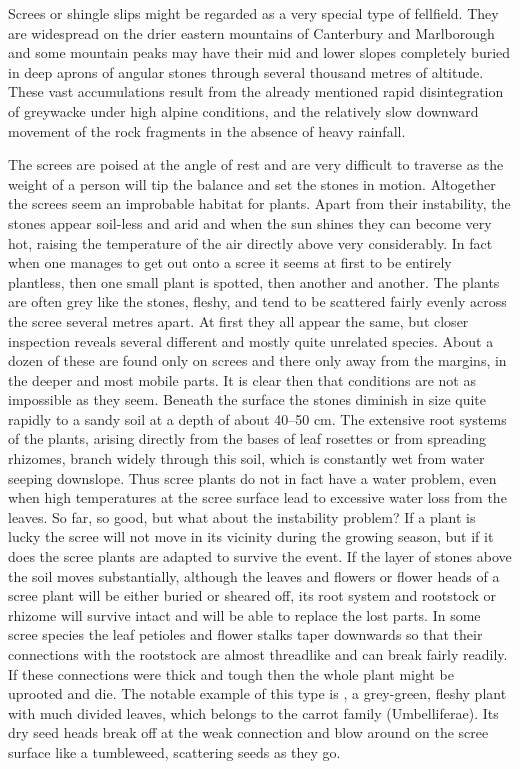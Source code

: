 Screes or shingle slips might be regarded as a very special type of fellfield.
They are widespread on the drier eastern mountains of Canterbury and Marlborough and some mountain peaks may have their mid and lower slopes completely buried in deep aprons of angular stones through several thousand metres of altitude.
These vast accumulations result from the already mentioned rapid disintegration of greywacke under high alpine conditions, and the relatively slow downward movement of the rock fragments in the absence of heavy rainfall.

The screes are poised at the angle of rest and are very difficult to traverse as the weight of a person will tip the balance and set the stones in motion.
Altogether the screes seem an improbable habitat for plants.
Apart from their instability, the stones appear soil-less and arid and when the sun shines they can become very hot, raising the temperature of the air directly above very considerably.
In fact when one manages to get out onto a scree it seems at first to be entirely plantless, then one small plant is spotted, then another and another.
The plants are often grey like the stones, fleshy, and tend to be scattered fairly evenly across the scree several metres apart.
At first they all appear the same, but closer inspection reveals several different and mostly quite unrelated species.
About a dozen of these are found only on screes and there only away from the margins, in the deeper and most mobile parts.
It is clear then that conditions are not as impossible as they seem.
Beneath the surface the stones diminish in size quite rapidly to a sandy soil at a depth of about 40--50 cm.
The extensive root systems of the plants, arising directly from the bases of leaf rosettes or from spreading rhizomes, branch widely through this soil, which is constantly wet from water seeping downslope.
Thus scree plants do not in fact have a water problem, even when high temperatures at the scree surface lead to excessive water loss from the leaves.
So far, so good, but what about the instability problem? If a plant is lucky the scree will not move in its vicinity during the growing season, but if it does the scree plants are adapted to survive the event.
If the layer of stones above the soil moves substantially, although the leaves and flowers or flower heads of a scree plant will be either buried or sheared off, its root system and rootstock or rhizome will survive intact and will be able to replace the lost parts.
In some scree species the leaf petioles and flower stalks taper downwards so that their connections with the rootstock are almost threadlike and can break fairly readily.
If these connections were thick and tough then the whole plant might be uprooted and die.
The notable example of this type is , a grey-green, fleshy plant with much divided leaves, which belongs to the carrot family (Umbelliferae).
Its dry seed heads break off at the weak connection and blow around on the scree surface like a tumbleweed, scattering seeds as they go.

